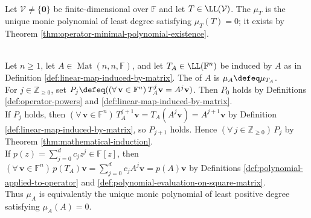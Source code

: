 \begin{definition} \label{def:operator-minimal-polynomial} \\
Let $\mathcal{V}\neq\{\mathbf{0}\}$ be finite-dimensional over $\mathbb{F}$ and let $T\in\LL(\mathcal{V})$. The  $\mu_T$ is the unique monic polynomial of least degree satisfying $\mu_T(T)=0$; it exists by Theorem \ref{thm:operator-minimal-polynomial-existence}.
\end{definition}

\begin{definition} \label{def:minimal-polynomial-matrix} \\
Let $n\geq1$, let $A\in\operatorname{Mat}(n,n,\mathbb{F})$, and let $T_A\in\LL(\mathbb{F}^n)$ be induced by $A$ as in Definition \ref{def:linear-map-induced-by-matrix}. The  of $A$ is $\mu_A\defeq\mu_{T_A}$.\\
For $j\in\mathbb{Z}_{\geq0}$, set $P_j\defeq((\forall\,\mathbf{v}\in\mathbb{F}^n)\,T_A^j\mathbf{v}=A^j\mathbf{v})$. Then $P_0$ holds by Definitions \ref{def:operator-powers} and \ref{def:linear-map-induced-by-matrix}.\\
If $P_j$ holds, then $(\forall\,\mathbf{v}\in\mathbb{F}^n)\,T_A^{j+1}\mathbf{v}=T_A(A^j\mathbf{v})=A^{j+1}\mathbf{v}$ by Definition \ref{def:linear-map-induced-by-matrix}, so $P_{j+1}$ holds. Hence $(\forall\,j\in\mathbb{Z}_{\geq0})\,P_j$ by Theorem \ref{thm:mathematical-induction}.\\
If $p(z)=\sum\limits_{j=0}^{d}c_jz^j\in\mathbb{F}[z]$, then $(\forall\,\mathbf{v}\in\mathbb{F}^n)\,p(T_A)\mathbf{v}=\sum\limits_{j=0}^{d}c_jA^j\mathbf{v}=p(A)\mathbf{v}$ by Definitions \ref{def:polynomial-applied-to-operator} and \ref{def:polynomial-evaluation-on-square-matrix}.\\
Thus $\mu_A$ is equivalently the unique monic polynomial of least positive degree satisfying $\mu_A(A)=0$.
\end{definition}

